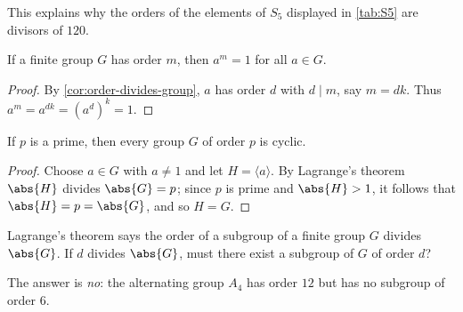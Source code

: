 This explains why the orders of the elements of \(S_5\) displayed in \autoref{tab:S5} are
divisors of \(120\).

\begin{corollary}\label{cor:am-equals-1}
	If a finite group \(G\) has order \(m\), then \(a^m = 1\) for all \(a \in G\).
\end{corollary}

\begin{proof}
	By \autoref{cor:order-divides-group}, \(a\) has order \(d\) with \(d \mid m\), say
	\(m = dk\). Thus \(a^m = a^{dk} = (a^d)^k = 1\).
\end{proof}

\begin{corollary}\label{cor:prime-order-cyclic}
	If \(p\) is a prime, then every group \(G\) of order \(p\) is cyclic.
\end{corollary}

\begin{proof}
	Choose \(a \in G\) with \(a \neq 1\) and let \(H = \langle a\rangle\). By Lagrange's
	theorem \(\abs{H}\) divides \(\abs{G} = p\); since \(p\) is prime and \(\abs{H} > 1\),
	it follows that \(\abs{H} = p = \abs{G}\), and so \(H = G\).
\end{proof}

\begin{question}
	Lagrange's theorem says the order of a subgroup of a finite group \(G\) divides
	\(\abs{G}\). If \(d\) divides \(\abs{G}\), must there exist a subgroup of \(G\) of order
	\(d\)?
\end{question}

\begin{remark}
	The answer is \emph{no}: the alternating group \(A_4\) has order \(12\) but has no
	subgroup of order \(6\).
\end{remark}
